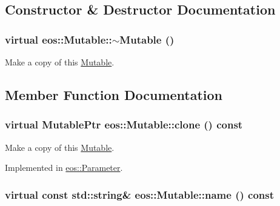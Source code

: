 \subsection{Constructor \& Destructor Documentation}
\hypertarget{classeos_1_1Mutable_a928ec6648a438f02b6369a8863d39560}{
\subsubsection[{$\sim$Mutable}]{\setlength{\rightskip}{0pt plus 5cm}virtual eos::Mutable::$\sim$Mutable ()}}
\label{classeos_1_1Mutable_a928ec6648a438f02b6369a8863d39560}


Make a copy of this \hyperlink{classeos_1_1Mutable}{Mutable}. 

\subsection{Member Function Documentation}
\hypertarget{classeos_1_1Mutable_a31d51dbb25d02ad989592b43de8a787b}{
\subsubsection[{clone}]{\setlength{\rightskip}{0pt plus 5cm}virtual {\bf MutablePtr} eos::Mutable::clone () const}}
\label{classeos_1_1Mutable_a31d51dbb25d02ad989592b43de8a787b}


Make a copy of this \hyperlink{classeos_1_1Mutable}{Mutable}. 

Implemented in \hyperlink{classeos_1_1Parameter_a8a643807f254a9601349c779cf6211dc}{eos::Parameter}.\hypertarget{classeos_1_1Mutable_ad215a3863435593930a3543866881f49}{
\subsubsection[{name}]{\setlength{\rightskip}{0pt plus 5cm}virtual const std::string\& eos::Mutable::name () const}}
\label{classeos_1_1Mutable_ad215a3863435593930a3543866881f49}


